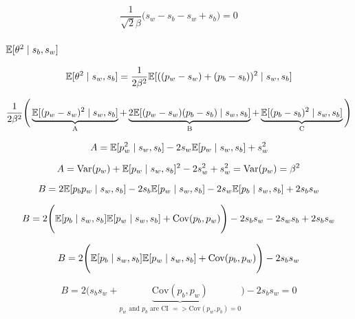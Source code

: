 \documentclass[a4paper,11pt]{article}
\theoremstyle{mytheor}
\newcommand{\E}{\Bbb{E}}
\newcommand{\Var}{\mathrm{Var}}
\newcommand{\Cov}{\mathrm{Cov}}
\begin{document}
\begin{equation}
    \label{e_psi_4}
    \frac{1}{\sqrt{2}\beta} \Bigg( s_w-s_b-s_w+s_b \Bigg) = 0
\end{equation}


\subsubsection{$\E[\theta^2 \mid s_b,s_w]$}

\begin{equation}
    \label{e_theta_sq}
    \Bbb{E}[\theta^2\mid s_w,s_b] = \frac{1}{2\beta^2}\Bbb{E}[((p_w-s_w)+(p_b-s_b))^2 \mid s_w,s_b]
\end{equation}

\begin{equation}
    \label{e_theta_sq_2}
    \frac{1}{2\beta^2} \Bigg( \underbrace{\Bbb{E}[(p_w-s_w)^2\mid s_w,s_b]}_\text{A} + \underbrace{2\Bbb{E}[(p_w-s_w)(p_b-s_b)\mid s_w,s_b]}_\text{B} + \underbrace{\Bbb{E}[(p_b-s_b)^2\mid s_w,s_b]}_\text{C} \Bigg)
\end{equation}

\begin{equation}
    \label{e_theta_sq_2_a}
    A=\Bbb{E}[p_w^2\mid s_w,s_b] - 2s_w\Bbb{E}[p_w\mid s_w,s_b] + s_{w}^{2}
\end{equation}

\begin{equation}
    \label{e_theta_sq_2_a_1}
    A=\Var(p_w)+\E[p_w\mid s_w,s_b]^2 - 2s_w^2 + s_{w}^{2} = \Var(p_w) = \beta^2
\end{equation}

\begin{equation}
    \label{e_theta_sq_2_b}
    B=2\E[p_bp_w \mid s_w,s_b] - 2s_b\E[p_w \mid s_w,s_b] - 2s_w\E[p_b \mid s_w,s_b] + 2s_bs_w
\end{equation}

\begin{equation}
    \label{e_theta_sq_2_b_1}
    B=2 \Bigg( \E[p_b \mid s_w,s_b]\E[p_w \mid s_w,s_b] + \Cov(p_b,p_w) \Bigg) - 2s_bs_w - 2s_ws_b + 2s_bs_w
\end{equation}

\begin{equation}
    \label{e_theta_sq_2_b_2}
    B=2 \Bigg( \E[p_b \mid s_w,s_b]\E[p_w \mid s_w,s_b] + \Cov(p_b,p_w) \Bigg) - 2s_bs_w
\end{equation}

\begin{equation}
    \label{e_theta_sq_2_b_2}
    B=2 \Bigg( s_bs_w +  \underbrace{\Cov(p_b,p_w)}_\text{$p_w$ and $p_b$ are CI $=> \Cov(p_w,p_b)=0$} \Bigg) - 2s_bs_w=0
\end{equation}
\end{document}
